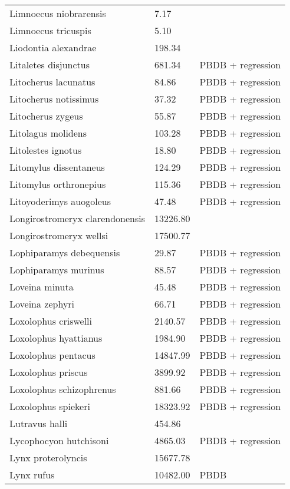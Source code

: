 \begin{center}
\begin{longtable}{p{} p{} p{} }
  Limnoecus niobrarensis & 7.17 & \cite{Tomiya2013} \\ 
  Limnoecus tricuspis & 5.10 & \cite{Tomiya2013} \\ 
  Liodontia alexandrae & 198.34 & \cite{Tomiya2013} \\ 
  Litaletes disjunctus & 681.34 & PBDB + regression \\ 
  Litocherus lacunatus & 84.86 & PBDB + regression \\ 
  Litocherus notissimus & 37.32 & PBDB + regression \\ 
  Litocherus zygeus & 55.87 & PBDB + regression \\ 
  Litolagus molidens & 103.28 & PBDB + regression \\ 
  Litolestes ignotus & 18.80 & PBDB + regression \\ 
  Litomylus dissentaneus & 124.29 & PBDB + regression \\ 
  Litomylus orthronepius & 115.36 & PBDB + regression \\ 
  Litoyoderimys auogoleus & 47.48 & PBDB + regression \\ 
  Longirostromeryx clarendonensis & 13226.80 & \cite{Tomiya2013} \\ 
  Longirostromeryx wellsi & 17500.77 & \cite{Tomiya2013} \\ 
  Lophiparamys debequensis & 29.87 & PBDB + regression \\ 
  Lophiparamys murinus & 88.57 & PBDB + regression \\ 
  Loveina minuta & 45.48 & PBDB + regression \\ 
  Loveina zephyri & 66.71 & PBDB + regression \\ 
  Loxolophus criswelli & 2140.57 & PBDB + regression \\ 
  Loxolophus hyattianus & 1984.90 & PBDB + regression \\ 
  Loxolophus pentacus & 14847.99 & PBDB + regression \\ 
  Loxolophus priscus & 3899.92 & PBDB + regression \\ 
  Loxolophus schizophrenus & 881.66 & PBDB + regression \\ 
  Loxolophus spiekeri & 18323.92 & PBDB + regression \\ 
  Lutravus halli & 454.86 & \cite{Tomiya2013} \\ 
  Lycophocyon hutchisoni & 4865.03 & PBDB + regression \\ 
  Lynx proterolyncis & 15677.78 & \cite{Tomiya2013} \\ 
  Lynx rufus & 10482.00 & PBDB \\ 

\end{longtable}
\end{center}
